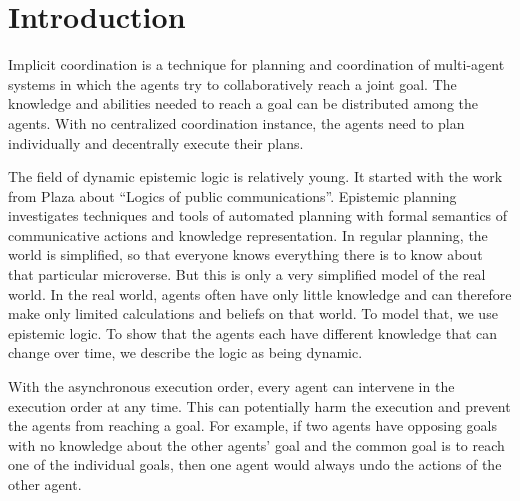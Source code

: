 \chapter{Introduction}\label{chap:introduction}





Implicit coordination is a technique for planning and coordination of multi-agent systems in which the agents try to collaboratively reach a joint goal. The knowledge and abilities needed to reach a goal can be distributed among the agents. With no centralized coordination instance, the agents need to plan individually and decentrally execute their plans.


The field of dynamic epistemic logic is relatively young. It started with the work from Plaza \cite{plaza1989logics} about ``Logics of public communications''.
Epistemic planning investigates techniques and tools of automated planning with formal semantics of communicative actions and knowledge representation.
In regular planning, the world is simplified, so that everyone knows everything there is to know about that particular microverse. But this is only a very simplified model of the real world. In the real world, agents often have only little knowledge and can therefore make only limited calculations and beliefs on that world. To model that, we use epistemic logic. To show that the agents each have different knowledge that can change over time, we describe the logic as being dynamic.

With the asynchronous execution order, every agent can intervene in the execution order at any time. This can potentially harm the execution and prevent the agents from reaching a goal. For example, if two agents have opposing goals with no knowledge about the other agents' goal and the common goal is to reach one of the individual goals, then one agent would always undo the actions of the other agent.

